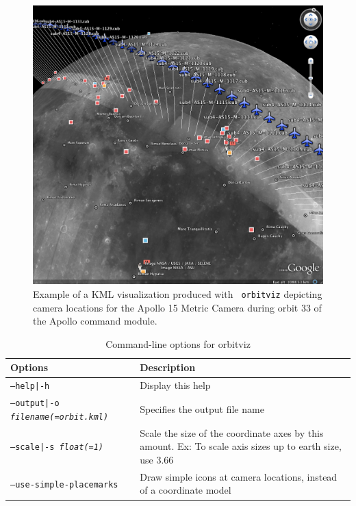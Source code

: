 \begin{figure}[ht]
  \begin{center}
  \includegraphics[width=6in]{images/orbitviz_ge_result.png}
  \end{center}
  \caption{ Example of a \ac{KML} visualization produced with {\tt
      orbitviz} depicting camera locations for the Apollo 15 Metric
    Camera during orbit 33 of the Apollo command module.}
  \label{fig:orbitviz_example}
\end{figure}

\begin{longtable}{|l|p{10cm}|}
\caption{Command-line options for orbitviz}
\label{tbl:orbitviz}
\endfirsthead
\endhead
\endfoot
\endlastfoot
\hline
Options & Description \\ \hline \hline
\texttt{--help|-h} & Display this help \\ \hline
\texttt{--output|-o \textit{filename(=orbit.kml)}} & Specifies the output file name \\ \hline
\texttt{--scale|-s \textit{float(=1)}} & Scale the size of the coordinate axes by this amount. Ex: To scale axis sizes up to earth size, use 3.66 \\ \hline
\texttt{--use-simple-placemarks} & Draw simple icons at camera locations, instead of a coordinate model \\ \hline
\end{longtable}


